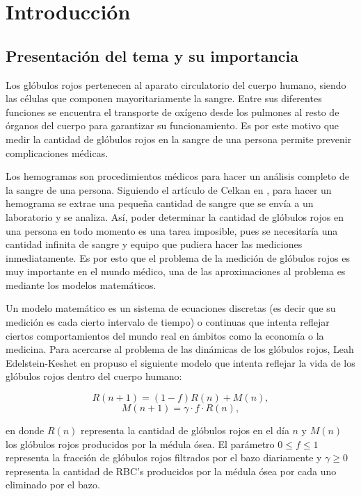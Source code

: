 \chapter{Introducción}\label{chap:intro}

\section{Presentación del tema y su importancia}

Los glóbulos rojos pertenecen al aparato circulatorio del cuerpo humano, siendo las células que componen mayoritariamente la sangre. Entre sus diferentes funciones se encuentra el transporte de oxígeno desde los pulmones al resto de órganos del cuerpo para garantizar su funcionamiento. Es por este motivo que medir la cantidad de glóbulos rojos en la sangre de una persona permite prevenir complicaciones médicas.

Los hemogramas son procedimientos médicos para hacer un análisis completo de la sangre de una persona. Siguiendo el artículo de Celkan en \cite{celkan2020does}, para hacer un hemograma se extrae una pequeña cantidad de sangre que se envía a un laboratorio y se analiza. Así, poder determinar la cantidad de glóbulos rojos en una persona en todo momento es una tarea imposible, pues se necesitaría una cantidad infinita de sangre y equipo que pudiera hacer las mediciones inmediatamente. Es por esto que el problema de la medición de glóbulos rojos es muy importante en el mundo médico, una de las aproximaciones al problema es mediante los modelos matemáticos.

Un modelo matemático es un sistema de ecuaciones discretas (es decir que su medición es cada cierto intervalo de tiempo) o continuas que intenta reflejar ciertos comportamientos del mundo real en ámbitos como la economía o la medicina. Para acercarse al problema de las dinámicas de los glóbulos rojos, Leah Edelstein-Keshet en \cite{edelstein2005} propuso el siguiente modelo que intenta reflejar la vida de los glóbulos rojos dentro del cuerpo humano:

$$R(n+1)=(1-f)R(n)+M(n),$$
$$M(n+1)=\gamma \cdot f\cdot R(n),$$

en donde $R(n)$ representa la cantidad de glóbulos rojos en el día $n$ y $M(n)$ los glóbulos rojos producidos por la médula ósea. El parámetro $0\leq f \leq 1$ representa la fracción de glóbulos rojos filtrados por el bazo diariamente y $\gamma \geq 0$ representa la cantidad de RBC's producidos por la médula ósea por cada uno eliminado por el bazo. 

